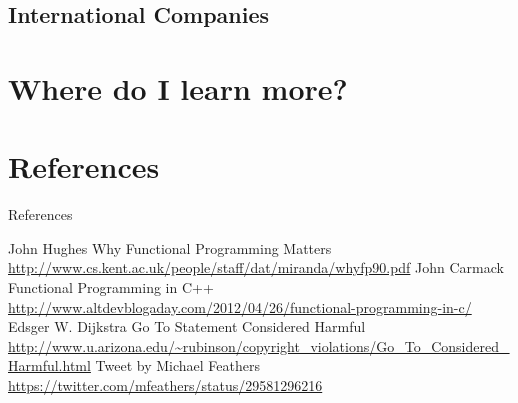\documentclass{beamer}
\begin{document}
\subsection{International Companies}

\section{Where do I learn more?}

\section{References}

\begin{frame}[allowframebreaks]{References}
  \begin{thebibliography}{10}
      John Hughes
      \newblock Why Functional Programming Matters
      \newblock \url{http://www.cs.kent.ac.uk/people/staff/dat/miranda/whyfp90.pdf}
      John Carmack
      \newblock Functional Programming in C++
      \newblock \url{http://www.altdevblogaday.com/2012/04/26/functional-programming-in-c/}
      Edsger W. Dijkstra
      \newblock Go To Statement Considered Harmful
      \newblock \url{http://www.u.arizona.edu/~rubinson/copyright_violations/Go_To_Considered_Harmful.html}
      Tweet by Michael Feathers
      \newblock \url{https://twitter.com/mfeathers/status/29581296216}
  \end{thebibliography}
\end{frame}
\end{document}

